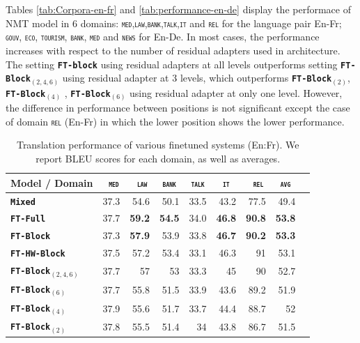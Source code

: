 \documentclass[11pt,a4paper]{article}
\newcommand{\fyTodo}[1]{\Todo[FY:]{\textcolor{orange}{#1}}}
\newcommand{\domain}[1]{\texttt{\textsc{#1}}}
\newcommand{\system}[1]{\texttt{\textbf{#1}}}
\newcommand{\SB}[1]{\textbf{#1}}
\begin{document}
Tables \ref{tab:Corpora-en-fr} and \ref{tab:performance-en-de} display the performace of NMT model in 6 domains: \domain{med},\domain{law},\domain{bank},\domain{talk},\domain{it} and \domain{rel} for the language pair En-Fr; \domain{gouv}, \domain{eco}, \domain{tourism}, \domain{bank}, \domain{med} and \domain{news} for En-De. In most cases, the performance increases with respect to the number of residual adapters used in architecture. The setting \system{FT-block} using residual adapters at all levels outperforms setting \system{FT-Block$_{(2,4,6)}$} using residual adapter at 3 levels, which outperforms \system{FT-Block$_{(2)}$}, \system{FT-Block$_{(4)}$} , \system{FT-Block$_{(6)}$} using residual adapter at only one level. However, the difference in performance between positions is not significant except the case of domain \domain{rel} (En-Fr) in which the lower position shows the lower performance.\fyTodo{What does bold mean ?}\fyTodo{Number of parameters ?} 
\begin{table}
  \centering
  \begin{tabular}{|p{3cm}|*{8}{r|}} \hline
    Model / Domain & \multicolumn{1}{c|}{\domain{ med}} & \multicolumn{1}{c|}{\domain{ law}} & \multicolumn{1}{c|}{\domain{bank}} & \multicolumn{1}{c|}{\domain{talk}} & \multicolumn{1}{c|}{\domain{ it }} & \multicolumn{1}{c|}{\domain{ rel}} & \multicolumn{1}{c|}{\domain{avg}} \\ \hline %
    \system{Mixed}  & 37.3 & 54.6 & 50.1 & 33.5 & 43.2 & 77.5  & 49.4 \\
    \system{FT-Full}       & 37.7 & \SB{59.2} & \SB{54.5} & 34.0 & \SB{46.8} & \SB{90.8} & \SB{53.8} \\
    \system{FT-Block}     & 37.3 & \SB{57.9} & 53.9 & 33.8 & \SB{46.7} & \SB{90.2} & \SB{53.3} \\ 
    \system{FT-HW-Block}   & 37.5 & 57.2 & 53.4 & 33.1 & 46.3 & 91 & 53.1 \\ 
    \system{FT-Block$_{(2,4,6)}$}     & 37.7 & 57 & 53 & 33.3 & 45 & 90 & 52.7 \\
    \system{FT-Block$_{(6)}$}     & 37.7 & 55.8 & 51.5 & 33.9 & 43.6 & 89.2 & 51.9 \\
    \system{FT-Block$_{(4)}$}     & 37.9 & 55.6 & 51.7 & 33.7 & 44.4 & 88.7 & 52 \\
   \system{FT-Block$_{(2)}$}     & 37.8 & 55.5 & 51.4 & 34 & 43.8 & 86.7 & 51.5 \\
     \hline
  \end{tabular}
  \caption{Translation performance of various finetuned systems (En:Fr). We report BLEU scores for each domain, as well as averages.}\fyTodo{Boldface ?}
  \label{tab:performance-en-fr}
\end{table}
\end{document}
